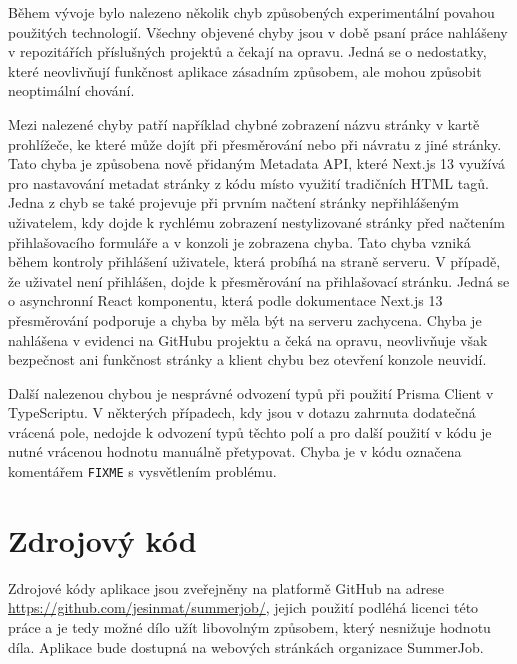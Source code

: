 Během vývoje bylo nalezeno několik chyb způsobených experimentální povahou použitých technologií. Všechny objevené chyby jsou v době psaní práce
nahlášeny v repozitářích příslušných projektů a čekají na opravu. Jedná se o nedostatky, které neovlivňují funkčnost aplikace zásadním způsobem, ale mohou způsobit
neoptimální chování.

Mezi nalezené chyby patří například chybné zobrazení názvu stránky v kartě prohlížeče, ke které může dojít při přesměrování nebo při 
návratu z jiné stránky. Tato chyba je způsobena nově přidaným Metadata API, které Next.js 13 využívá pro nastavování metadat stránky z kódu místo využití tradičních
HTML tagů. Jedna z chyb se také projevuje při prvním načtení stránky nepřihlášeným uživatelem, kdy dojde k rychlému zobrazení nestylizované stránky před načtením
přihlašovacího formuláře a v konzoli je zobrazena chyba. Tato chyba vzniká během kontroly přihlášení uživatele, která probíhá na straně serveru. V případě, že 
uživatel není přihlášen, dojde k přesměrování na přihlašovací stránku. Jedná se o asynchronní React komponentu, která podle dokumentace Next.js 13 přesměrování podporuje a chyba by 
měla být na serveru zachycena. Chyba je nahlášena v evidenci na GitHubu projektu a čeká na opravu, neovlivňuje však bezpečnost ani funkčnost stránky a klient
chybu bez otevření konzole neuvidí.

Další nalezenou chybou je nesprávné odvození typů při použití Prisma Client v TypeScriptu. V některých případech, kdy jsou v dotazu zahrnuta dodatečná vrácená pole, nedojde
k odvození typů těchto polí a pro další použití v kódu je nutné vrácenou hodnotu manuálně přetypovat. Chyba je v kódu označena komentářem \texttt{FIXME} s vysvětlením problému.

\section{Zdrojový kód}

Zdrojové kódy aplikace jsou zveřejněny na platformě GitHub na adrese \url{https://github.com/jesinmat/summerjob/}, jejich použití podléhá licenci této práce
 a je tedy možné dílo užít libovolným způsobem, který nesnižuje hodnotu díla. Aplikace bude dostupná na webových stránkách organizace SummerJob.
